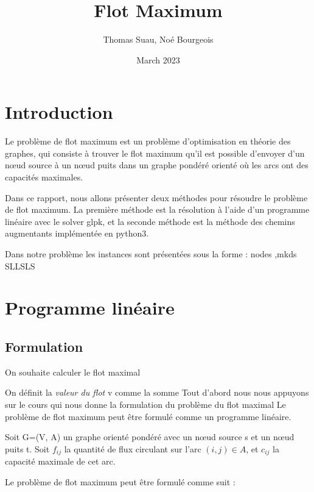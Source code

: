 \documentclass{article}
\begin{document}
\title{Flot Maximum}
\author{Thomas Suau, Noé Bourgeois }
\date{March 2023}

\maketitle

\tableofcontents
 
 \newpage

    \section{Introduction}
    Le problème de flot maximum est un problème d'optimisation en théorie des graphes,
    qui consiste à trouver le flot maximum qu'il est possible d'envoyer d'un nœud source à un nœud puits
    dans un graphe pondéré orienté où les arcs ont des capacités maximales.

    Dans ce rapport, nous allons présenter deux méthodes
    pour résoudre le problème de flot maximum.
    La première méthode est la résolution à l'aide d'un programme linéaire avec le solver glpk,
    et la seconde méthode est la méthode des chemins augmentants implémentée en python3.
    
    Dans notre problème les instances sont présentées sous la forme : 
    nodes
    ,mkds
    SLLSLS
    

\section{Programme linéaire}
    
\subsection{Formulation}

On souhaite calculer le flot maximal 


On définit la {\it valeur du flot} v comme la somme
Tout d'abord nous nous appuyons sur le cours qui nous donne la formulation du problème du flot maximal 
Le problème de flot maximum peut être formulé comme un programme linéaire.
       
Soit G=(V, A) un graphe orienté pondéré avec un nœud source s et un nœud puits t.
Soit $f_{ij}$ la quantité de flux circulant sur l'arc $(i,j) \in A$, et $c_{ij}$ la capacité maximale de cet arc.

Le problème de flot maximum peut être formulé comme suit : \\
\end{document}
